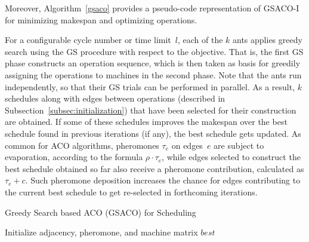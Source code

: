 Moreover, Algorithm~\ref{gsaco} provides a pseudo-code representation of
GSACO-I for minimizing makespan and optimizing operations.

For a configurable cycle number or time limit~$l$,
each of the $k$ ants applies greedy search
using the GS procedure with respect to the objective.
That is, the first GS phase constructs an operation sequence, which is
then taken as basis for greedily assigning the operations to machines
in the second phase.   
Note that the ants run independently, so that their GS trials
can be performed in parallel.
As a result, $k$ schedules along with edges between operations
(described in Subsection~\ref{subsec:initialization})
that have been selected for their construction are obtained.
If some of these schedules improves the makespan over the best
schedule found in previous iterations (if any),
the best schedule gets updated.
As common for ACO algorithms,
pheromones $\tau_e$ on edges~$e$ are subject to evaporation,
according to the formula $\rho\cdot\tau_e$,
while edges selected to construct the best schedule obtained
so far also receive a pheromone contribution,
calculated as $\tau_e+c$.
Such pheromone deposition increases the chance for edges contributing to the
current best schedule
to get re-selected %
in forthcoming iterations.

\begin{algorithm}[ht]
	\caption{Greedy Search based ACO (GSACO) for Scheduling}
	\label{gsaco}
	Initialize adjacency, pheromone, and machine matrix\; 
	\Return $\mathit{best}$\;
\end{algorithm}


